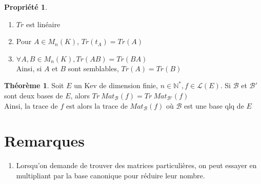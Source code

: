 \documentclass[fleqn]{article}
\theoremstyle{definition} \newtheorem*{defi}{D\'efinition}
\theoremstyle{definition} \newtheorem*{theo}{Th\'eor\`eme}
\theoremstyle{definition} \newtheorem*{coro}{Corollaire}
\theoremstyle{definition} \newtheorem*{nota}{Notation}
\theoremstyle{definition} \newtheorem*{vocab}{Vocabulaire}
\theoremstyle{remark} \newtheorem*{rqs}{Remarques}
\theoremstyle{definition} \newtheorem*{prop}{Propri\'et\'e}
\begin{document}
\begin{prop} $ $
	\begin{enumerate}
		\item $Tr$ est lin\'eaire
		\item Pour $A \in M_n(K)$, $Tr(t_A) = Tr(A)$
		\item $\forall A,B \in M_n(K), Tr(AB) = Tr(BA)$ \\
			Ainsi, si $A$ et $B$ sont semblables, $Tr(A) = Tr(B)$
	\end{enumerate}
\end{prop}

\begin{theo}
	Soit $E$ un Kev de dimension finie, $n \in \mathbb{N}^*, f \in \mathscr{L}(E)$. Si $\mathscr{B}$ et $\mathscr{B}'$ sont deux bases de $E$,
	alors $Tr\ Mat_{\mathscr{B}}(f) = Tr\ Mat_{\mathscr{B}'}(f)$ \\
	Ainsi, la trace de $f$ est alors la trace de $Mat_{\mathscr{B}}(f)$ o\`u $\mathscr{B}$ est une base qlq de $E$
\end{theo}

\section{Remarques}

\begin{enumerate}
	\item Lorsqu'on demande de trouver des matrices particuli\`eres, on peut essayer en multipliant par la base canonique pour r\'eduire leur
		nombre.
\end{enumerate}
\end{document}
